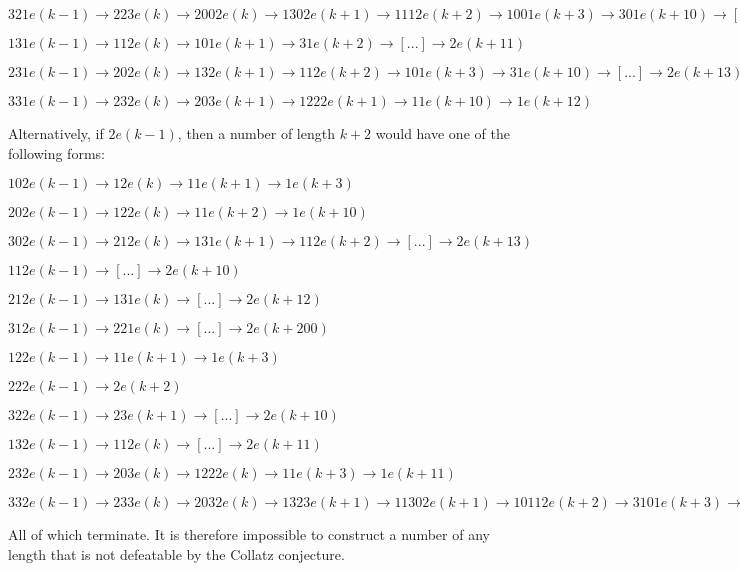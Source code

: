 \documentclass{proc-l}
\theoremstyle{definition}
\theoremstyle{remark}
\numberwithin{equation}{section}
\begin{document}
$321e(k-1) \rightarrow 223e(k) \rightarrow 2002e(k) \rightarrow 1302e(k+1) \rightarrow 1112e(k+2) \rightarrow 1001e(k+3) \rightarrow 301e(k+10) \rightarrow [...] \rightarrow 2e(k+30)$

$131e(k-1) \rightarrow 112e(k) \rightarrow 101e(k+1) \rightarrow 31e(k+2) \rightarrow [...] \rightarrow 2e(k+11) $

$231e(k-1) \rightarrow 202e(k) \rightarrow 132e(k+1) \rightarrow 112e(k+2) \rightarrow 101e(k+3) \rightarrow 31e(k+10) \rightarrow [...] \rightarrow 2e(k+13)$

$331e(k-1) \rightarrow 232e(k) \rightarrow 203e(k+1) \rightarrow 1222e(k+1) \rightarrow 11e(k+10) \rightarrow 1e(k+12)$


Alternatively, if $2e(k-1)$, then a number of length $k+2$ would have one of the following forms:

$102e(k-1) \rightarrow 12e(k) \rightarrow 11e(k+1) \rightarrow 1e(k+3)$

$202e(k-1) \rightarrow 122e(k) \rightarrow 11e(k+2) \rightarrow 1e(k+10)$

$302e(k-1) \rightarrow 212e(k) \rightarrow 131e(k+1) \rightarrow 112e(k+2) \rightarrow [...] \rightarrow 2e(k+13)$

$112e(k-1) \rightarrow [...] \rightarrow 2e(k+10)$

$212e(k-1) \rightarrow 131e(k) \rightarrow [...] \rightarrow 2e(k+12)$

$312e(k-1) \rightarrow 221e(k) \rightarrow [...] \rightarrow 2e(k+200)$

$122e(k-1) \rightarrow 11e(k+1) \rightarrow 1e(k+3)$

$222e(k-1) \rightarrow 2e(k+2)$

$322e(k-1) \rightarrow 23e(k+1) \rightarrow [...] \rightarrow 2e(k+10)$

$132e(k-1) \rightarrow 112e(k) \rightarrow [...] \rightarrow 2e(k+11)$

$232e(k-1) \rightarrow 203e(k) \rightarrow 1222e(k) \rightarrow 11e(k+3) \rightarrow 1e(k+11)$

$332e(k-1) \rightarrow 233e(k) \rightarrow 2032e(k) \rightarrow 1323e(k+1) \rightarrow 11302e(k+1) \rightarrow 10112e(k+2) \rightarrow 3101e(k+3) \rightarrow 2131e(k+10) \rightarrow 1312e(k+11) \rightarrow 1121e(k+12) \rightarrow 1003e(k+13) \rightarrow 3022e(k+13) \rightarrow 212e(k+21) \rightarrow 131e(k+22) \rightarrow 112e(k+23) \rightarrow 101e(k+30) \rightarrow 31e(k+31) \rightarrow [...] \rightarrow 2e(k+100)$

All of which terminate. It is therefore impossible to construct a number of any length that is not defeatable by the Collatz conjecture.

\addtocounter{page}{6}



\end{document}
